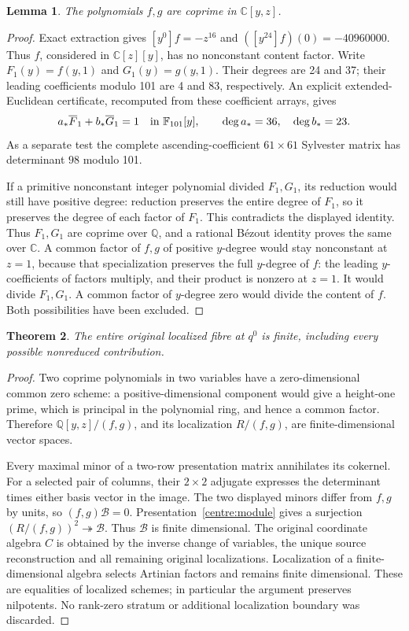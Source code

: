 \documentclass[11pt,a4paper]{article}
\newtheorem{theorem}{Theorem}[section]
\newtheorem{lemma}[theorem]{Lemma}\newtheorem{proposition}[theorem]{Proposition}
\theoremstyle{remark}\newtheorem{remark}[theorem]{Remark}
\begin{document}
\begin{lemma}\label{centre:coprime}
The polynomials $f,g$ are coprime in $\mathbb C[y,z]$.
\end{lemma}
\begin{proof}
Exact extraction gives $[y^0]f=-z^{16}$ and
$([y^{24}]f)(0)=-40960000$. Thus $f$, considered in $\mathbb C[z][y]$,
has no nonconstant content factor. Write $F_1(y)=f(y,1)$ and
$G_1(y)=g(y,1)$. Their degrees are 24 and 37; their leading coefficients
modulo 101 are 4 and 83, respectively. An explicit extended-Euclidean
certificate, recomputed from these coefficient arrays, gives
\[
 a_*\overline F_1+b_*\overline G_1=1
 \quad\hbox{in }\mathbb F_{101}[y],\qquad
 \deg a_*=36,\quad\deg b_*=23.
\]
As a separate test the complete ascending-coefficient $61\times61$
Sylvester matrix has determinant $98$ modulo 101.

If a primitive nonconstant integer polynomial divided $F_1,G_1$, its
reduction would still have positive degree: reduction preserves the
entire degree of $F_1$, so it preserves the degree of each factor of
$F_1$. This contradicts the displayed identity. Thus $F_1,G_1$ are
coprime over $\mathbb Q$, and a rational B\'ezout identity proves the
same over $\mathbb C$. A common factor of $f,g$ of positive $y$-degree
would stay nonconstant at $z=1$, because that specialization preserves
the full $y$-degree of $f$: the leading $y$-coefficients of factors
multiply, and their product is nonzero at $z=1$. It would divide $F_1,G_1$. A common factor
of $y$-degree zero would divide the content of $f$. Both possibilities
have been excluded.
\end{proof}

\begin{theorem}\label{centre:finite}
The entire original localized fibre at $q^0$ is finite, including every
possible nonreduced contribution.
\end{theorem}
\begin{proof}
Two coprime polynomials in two variables have a zero-dimensional common
zero scheme: a positive-dimensional component would give a height-one
prime, which is principal in the polynomial ring, and hence a common
factor. Therefore $\mathbb Q[y,z]/(f,g)$, and its localization
$R/(f,g)$, are finite-dimensional vector spaces.

Every maximal minor of a two-row presentation matrix annihilates its
cokernel. For a selected pair of columns, their $2\times2$ adjugate
expresses the determinant times either basis vector in the image.
The two displayed minors differ from $f,g$ by units, so
$(f,g)\mathcal B=0$. Presentation~\eqref{centre:module} gives a
surjection $(R/(f,g))^2\twoheadrightarrow\mathcal B$. Thus
$\mathcal B$ is finite dimensional. The original coordinate algebra
$C$ is obtained by the inverse change of variables, the unique source
reconstruction and all remaining original localizations. Localization
of a finite-dimensional algebra selects Artinian factors and remains
finite dimensional. These are equalities of localized schemes; in
particular the argument preserves nilpotents. No rank-zero stratum or
additional localization boundary was discarded.
\end{proof}
\end{document}
